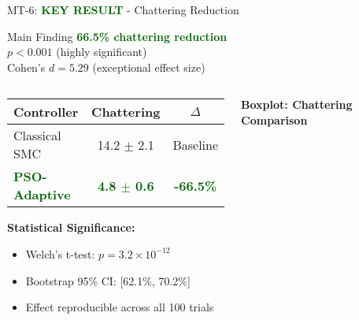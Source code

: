 \documentclass[10pt,aspectratio=169]{beamer}
\newcommand{\emphgreen}[1]{\textcolor{darkgreen}{\textbf{#1}}}
\begin{document}
\begin{frame}{MT-6: \emphgreen{KEY RESULT} - Chattering Reduction}
\begin{alertblock}{Main Finding}
\centering
\Large
\emphgreen{66.5\% chattering reduction} \\
\normalsize
$p < 0.001$ (highly significant) \\
Cohen's $d = 5.29$ (exceptional effect size)
\end{alertblock}

\vspace{0.3cm}
\begin{columns}
\begin{column}{0.5\textwidth}
\begin{table}
\small
\begin{tabular}{lcc}
\toprule
\textbf{Controller} & \textbf{Chattering} & \textbf{$\Delta$} \\
\midrule
Classical SMC & 14.2 $\pm$ 2.1 & Baseline \\
\emphgreen{PSO-Adaptive} & \emphgreen{4.8 $\pm$ 0.6} & \emphgreen{-66.5\%} \\
\bottomrule
\end{tabular}
\end{table}

\textbf{Statistical Significance:}
\begin{itemize}
    \item Welch's t-test: $p = 3.2 \times 10^{-12}$
    \item Bootstrap 95\% CI: [62.1\%, 70.2\%]
    \item Effect reproducible across all 100 trials
\end{itemize}
\end{column}
\begin{column}{0.5\textwidth}
\begin{center}
\textbf{Boxplot: Chattering Comparison}
\end{center}
\end{column}
\end{columns}
\end{frame}
\end{document}

